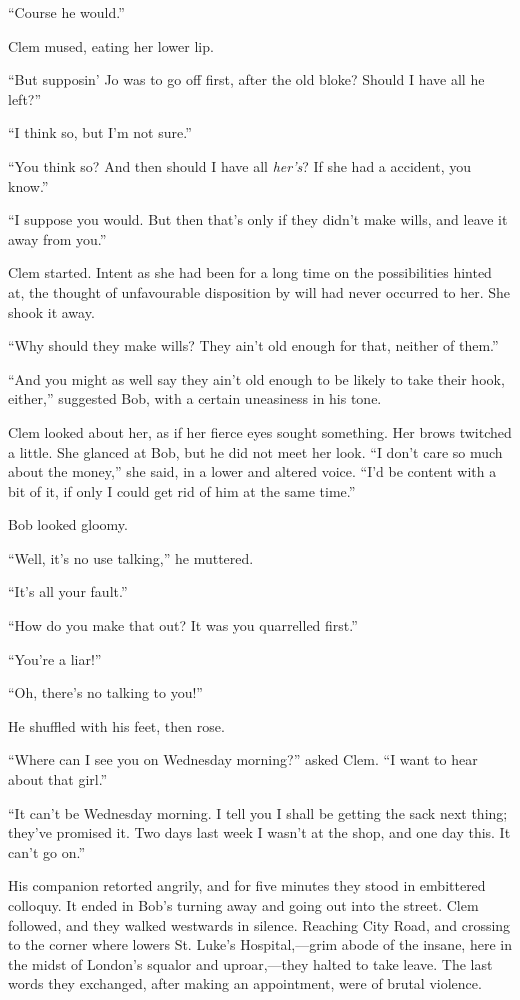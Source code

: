 ``Course he would.''

Clem mused, eating her lower lip.

``But supposin' Jo was to go off first, after the old bloke? Should I
have all he left?''

``I think so, but I'm not sure.''

``You think so? And then should I have all \emph{her's}? If she had a
accident, you know.''

``I suppose you would. But then that's only if they didn't make wills,
and leave it away from you.''

Clem started. Intent as she had been for a long time on the
possibilities hinted at, the thought of unfavourable disposition by will
had never occurred to her. She shook it away.

{\protect\hypertarget{35}{}{}}``Why should they make wills? They ain't
old enough for that, neither of them.''

``And you might as well say they ain't old enough to be likely to take
their hook, either,'' suggested Bob, with a certain uneasiness in his
tone.

Clem looked about her, as if her fierce eyes sought something. Her brows
twitched a little. She glanced at Bob, but he did not meet her look. ``I
don't care so much about the money,'' she said, in a lower and altered
voice. ``I'd be content with a bit of it, if only I could get rid of him
at the same time.''

Bob looked gloomy.

``Well, it's no use talking,'' he muttered.

``It's all your fault.''

``How do you make that out? It was you quarrelled first.''

``You're a liar!''

``Oh, there's no talking to you!''

He shuffled with his feet, then rose.

``Where can I see you on Wednesday morning?'' asked Clem. ``I want to
hear about that girl.''

``It can't be Wednesday morning. I tell you I shall be getting the sack
next thing; they've {\protect\hypertarget{36}{}{}}promised it. Two days
last week I wasn't at the shop, and one day this. It can't go on.''

His companion retorted angrily, and for five minutes they stood in
embittered colloquy. It ended in Bob's turning away and going out into
the street. Clem followed, and they walked westwards in silence.
Reaching City Road, and crossing to the corner where lowers St. Luke's
Hospital,---grim abode of the insane, here in the midst of London's
squalor and uproar,---they halted to take leave. The last words they
exchanged, after making an appointment, were of brutal violence.

